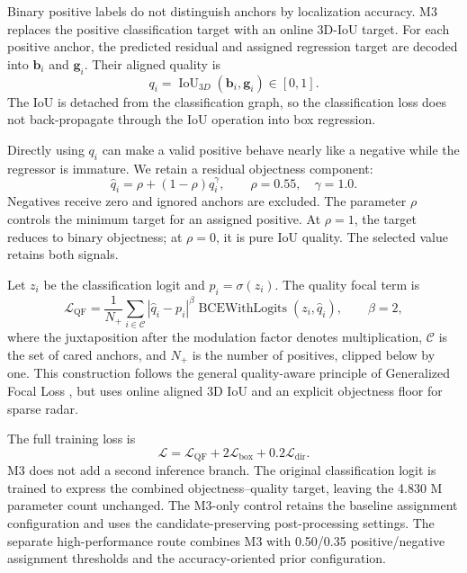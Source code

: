 \documentclass[sensors,article,submit,pdftex,moreauthors]{Definitions/mdpi}
\begin{document}
Binary positive labels do not distinguish anchors by localization accuracy.
M3 replaces the positive classification target with an online 3D-IoU target.
For each positive anchor, the predicted residual and assigned regression
target are decoded into $\mathbf{b}_i$ and $\mathbf{g}_i$. Their aligned
quality is
\begin{equation}
q_i=\operatorname{IoU}_{3D}(\mathbf{b}_i,\mathbf{g}_i)\in[0,1].
\end{equation}
The IoU is detached from the classification graph, so the classification loss
does not back-propagate through the IoU operation into box regression.

Directly using $q_i$ can make a valid positive behave nearly like a negative
while the regressor is immature. We retain a residual objectness component:
\begin{equation}
\widehat q_i=\rho+(1-\rho)q_i^\gamma,
\qquad \rho=0.55,\quad \gamma=1.0.
\label{eq:quality-target}
\end{equation}
Negatives receive zero and ignored anchors are excluded. The parameter $\rho$
controls the minimum target for an assigned positive. At $\rho=1$, the target
reduces to binary objectness; at $\rho=0$, it is pure IoU quality. The selected
value retains both signals.

Let $z_i$ be the classification logit and $p_i=\sigma(z_i)$. The quality focal
term is
\begin{equation}
\mathcal{L}_{\mathrm{QF}} =
\frac{1}{N_+}\sum_{i\in\mathcal{C}}
\left|\widehat q_i-p_i\right|^\beta
\operatorname{BCEWithLogits}(z_i,\widehat q_i),
\qquad \beta=2,
\end{equation}
where the juxtaposition after the modulation factor denotes multiplication,
$\mathcal{C}$ is the set of cared anchors, and $N_+$ is the number of
positives, clipped below by one. This construction follows the general
quality-aware principle of Generalized Focal Loss
\cite{li2022gfl}, but uses online aligned 3D IoU and an explicit objectness
floor for sparse radar.

The full training loss is
\begin{equation}
\mathcal{L}=\mathcal{L}_{\mathrm{QF}}
+2\mathcal{L}_{\mathrm{box}}+0.2\mathcal{L}_{\mathrm{dir}}.
\end{equation}
M3 does not add a second inference branch. The original classification logit
is trained to express the combined objectness--quality target, leaving the
4.830 M parameter count unchanged. The M3-only control retains the
baseline assignment configuration and uses the candidate-preserving
post-processing settings. The separate high-performance route combines M3
with 0.50/0.35 positive/negative assignment thresholds and the
accuracy-oriented prior configuration.
\end{document}
